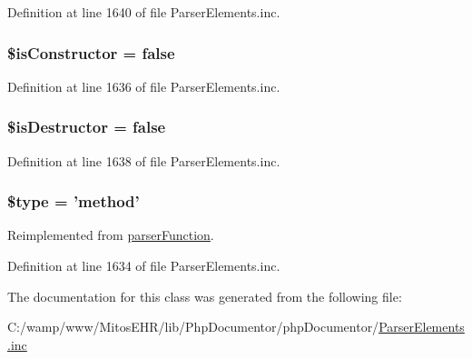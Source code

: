 \-Definition at line 1640 of file \-Parser\-Elements.\-inc.

\hypertarget{classparser_method_ab1ffb4e7e18be1bcf613619c56ab5ad5}{
\subsubsection[{\$is\-Constructor}]{\setlength{\rightskip}{0pt plus 5cm}\$is\-Constructor = false}}\label{classparser_method_ab1ffb4e7e18be1bcf613619c56ab5ad5}


\-Definition at line 1636 of file \-Parser\-Elements.\-inc.

\hypertarget{classparser_method_a1fb387a2abe714d49add5978a6bbac03}{
\subsubsection[{\$is\-Destructor}]{\setlength{\rightskip}{0pt plus 5cm}\$is\-Destructor = false}}\label{classparser_method_a1fb387a2abe714d49add5978a6bbac03}


\-Definition at line 1638 of file \-Parser\-Elements.\-inc.

\hypertarget{classparser_method_a9a4a6fba2208984cabb3afacadf33919}{
\subsubsection[{\$type}]{\setlength{\rightskip}{0pt plus 5cm}\$type = 'method'}}\label{classparser_method_a9a4a6fba2208984cabb3afacadf33919}


\-Reimplemented from \hyperlink{classparser_function_a9a4a6fba2208984cabb3afacadf33919}{parser\-Function}.



\-Definition at line 1634 of file \-Parser\-Elements.\-inc.



\-The documentation for this class was generated from the following file\-:\begin{DoxyCompactItemize}
\item 
\-C\-:/wamp/www/\-Mitos\-E\-H\-R/lib/\-Php\-Documentor/php\-Documentor/\hyperlink{_parser_elements_8inc}{\-Parser\-Elements.\-inc}\end{DoxyCompactItemize}
